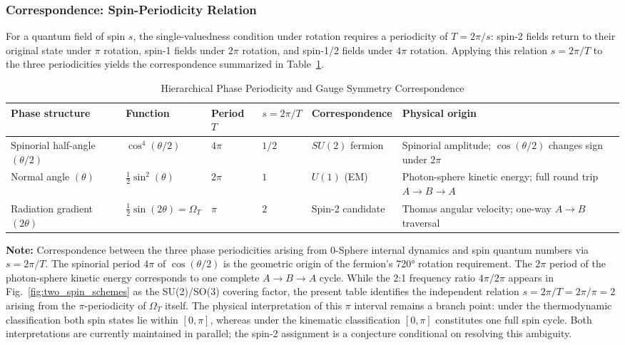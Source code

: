 \documentclass[%
 reprint,
 amsmath,amssymb,
 aps,
 prb,
]{revtex4-2}
\numberwithin{equation}{section}
\theoremstyle{definition}
\theoremstyle{remark}
\newcommand{\Uone}{U(1)}
\begin{document}
\subsubsection{Correspondence: Spin-Periodicity Relation}

For a quantum field of spin $s$, the single-valuedness condition under rotation requires a periodicity of $T = 2\pi / s$: spin-2 fields return to their original state under $\pi$ rotation, spin-1 fields under $2\pi$ rotation, and spin-1/2 fields under $4\pi$ rotation. Applying this relation $s = 2\pi / T$ to the three periodicities yields the correspondence summarized in Table~\ref{tab:gauge_correspondence}.

\begin{table}[t!]
\centering
\caption{Hierarchical Phase Periodicity and Gauge Symmetry Correspondence}
\label{tab:gauge_correspondence}
\renewcommand{\arraystretch}{1.4}
\begin{tabular}{p{4.0cm}p{3.0cm}p{1.8cm}p{1.8cm}p{2.5cm}p{3.0cm}}
\toprule
\textbf{Phase structure} & \textbf{Function} & \textbf{Period $T$} & \textbf{$s = 2\pi/T$} & \textbf{Correspondence} & \textbf{Physical origin} \\
\midrule
Spinorial half-angle $(\theta/2)$ & $\cos^4(\theta/2)$ & $4\pi$ & $1/2$ & $SU(2)$ fermion & Spinorial amplitude; $\cos(\theta/2)$ changes sign under $2\pi$ \\
\addlinespace[0.25cm]
Normal angle $(\theta)$ & $\tfrac{1}{2}\sin^2(\theta)$ & $2\pi$ & $1$ & $\Uone$ (EM) & Photon-sphere kinetic energy; full round trip $A\!\to\!B\!\to\!A$ \\
\addlinespace[0.25cm]
Radiation gradient $(2\theta)$ & $\tfrac{1}{2}\sin(2\theta) = \Omega_T$ & $\pi$ & $2$ & Spin-2 candidate & Thomas angular velocity; one-way $A\!\to\!B$ traversal \\
\bottomrule
\end{tabular}
\vspace{0.2cm}
\begin{flushleft}
\footnotesize
\textbf{Note:} Correspondence between the three phase periodicities arising from 0-Sphere internal dynamics and spin quantum numbers via $s = 2\pi/T$. The spinorial period $4\pi$ of $\cos(\theta/2)$ is the geometric origin of the fermion's 720° rotation requirement. The $2\pi$ period of the photon-sphere kinetic energy corresponds to one complete $A\to B\to A$ cycle. While the 2:1 frequency ratio $4\pi/2\pi$ appears in Fig.~\ref{fig:two_spin_schemes} as the SU(2)/SO(3) covering factor, the present table identifies the independent relation $s = 2\pi/T = 2\pi/\pi = 2$ arising from the $\pi$-periodicity of $\Omega_T$ itself. The physical interpretation of this $\pi$ interval remains a branch point: under the thermodynamic classification both spin states lie within $[0,\pi]$, whereas under the kinematic classification $[0,\pi]$ constitutes one full spin cycle. Both interpretations are currently maintained in parallel; the spin-2 assignment is a conjecture conditional on resolving this ambiguity.
\end{flushleft}
\end{table}
\end{document}
